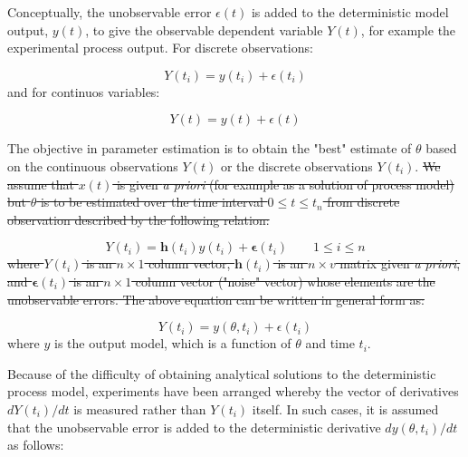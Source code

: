 \documentclass[../Article_Model_Parameters.tex]{subfiles}
\begin{document}
	
Conceptually, the unobservable error $\epsilon(t)$ is added to the deterministic model output, $y(t)$, to give the observable dependent variable $Y(t)$, for example the experimental process output. For discrete observations:

{\footnotesize
	\begin{equation}
		Y(t_i) = y(t_i) + \epsilon(t_i)
\end{equation} }
and for continuos variables:

{\footnotesize
	\begin{equation}
		Y(t) = y(t) + \epsilon(t)
\end{equation} }

The objective in parameter estimation is to obtain the "best" estimate of $\theta$ based on the continuous observations $Y(t)$ or the discrete observations $Y(t_i)$. 
\sout{
	We assume that $x(t)$ is given \textit{a priori} (for example as a solution of process model) but $\theta$ is to be estimated over the time interval $0 \leq t \leq t_n$ from discrete observation described by the following relation:}

{\footnotesize
	\begin{equation}
		Y(t_i) = \textbf{h}(t_i)y(t_i) + \boldsymbol{\epsilon}(t_i) \qquad 1 \leq i \leq n
\end{equation} }
\sout{where $ Y(t_i)$ is an $n \times 1$ column vector, $\textbf{h}(t_i)$ is an $n \times v$ matrix given \textit{a priori}, and $ \boldsymbol{\epsilon} (t_i)$ is an $n \times 1$ column vector ("noise" vector) whose elements are the unobservable errors. The above equation can be written in general form as:}

{\footnotesize
	\begin{equation} \label{EQ: Measurment_noise}
		Y(t_i) = y(\theta, t_i) + \epsilon(t_i)
\end{equation}}
where $y$ is the output model, which is a function of $\theta$ and time $t_i$.

Because of the difficulty of obtaining analytical solutions to the deterministic process model, experiments have been arranged whereby the vector of derivatives $d Y(t_i)/dt$ is measured rather than $Y(t_i)$ itself. In such cases, it is assumed that the unobservable error is added to the deterministic derivative $dy(\theta, t_i)/dt$ as follows:
\end{document}
